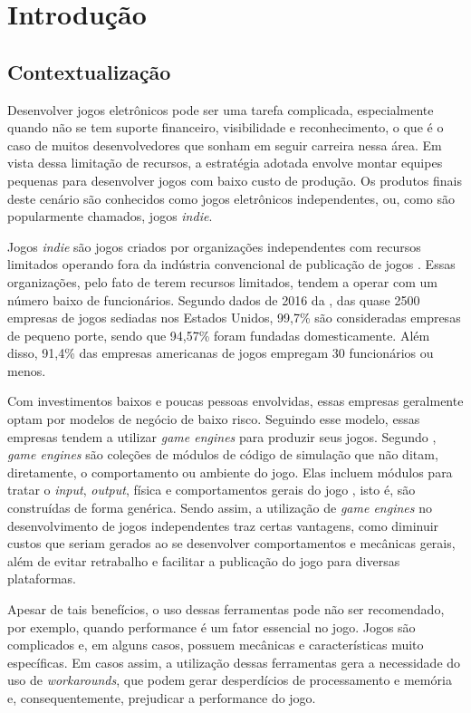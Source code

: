 \chapter*[Introdução]{Introdução}

\section*{Contextualização}

Desenvolver jogos eletrônicos pode ser uma tarefa complicada, especialmente quando não se tem suporte financeiro, visibilidade e reconhecimento, o que é o caso de muitos desenvolvedores que sonham em seguir carreira nessa área. Em vista dessa limitação de recursos, a estratégia adotada envolve montar equipes pequenas para desenvolver jogos com baixo custo de produção. Os produtos finais deste cenário são conhecidos como jogos eletrônicos independentes, ou, como são popularmente chamados, jogos \textit{indie}.

Jogos \textit{indie} são jogos criados por organizações independentes com recursos limitados operando fora da indústria convencional de publicação de jogos \cite{end2end}. Essas organizações, pelo fato de terem recursos limitados, tendem a operar com um número baixo de funcionários. Segundo dados de 2016 da , das quase 2500 empresas de jogos sediadas nos Estados Unidos, 99,7\% são consideradas empresas de pequeno porte, sendo que 94,57\% foram fundadas domesticamente. Além disso, 91,4\% das empresas americanas de jogos empregam 30 funcionários ou menos.

Com investimentos baixos e poucas pessoas envolvidas, essas empresas geralmente optam por modelos de negócio de baixo risco. Seguindo esse modelo, essas empresas tendem a utilizar \textit{game engines} para produzir seus jogos. Segundo , \textit{game engines} são coleções de módulos de código de simulação que não ditam, diretamente, o comportamento ou ambiente do jogo. Elas incluem módulos para tratar o \textit{input}, \textit{output}, física e comportamentos gerais do jogo \cite{gameengines}, isto é, são construídas de forma genérica. Sendo assim, a utilização de \textit{game engines} no desenvolvimento de jogos independentes traz certas vantagens, como diminuir custos que seriam gerados ao se desenvolver comportamentos e mecânicas gerais, além de evitar retrabalho e facilitar a publicação do jogo para diversas plataformas.

Apesar de tais benefícios, o uso dessas ferramentas pode não ser recomendado, por exemplo, quando performance é um fator essencial no jogo. Jogos são complicados e, em alguns casos, possuem mecânicas e características muito específicas. Em casos assim, a utilização dessas ferramentas gera a necessidade do uso de \textit{workarounds}, que podem gerar desperdícios de processamento e memória e, consequentemente, prejudicar a performance do jogo.

